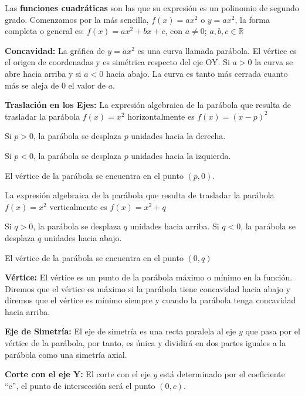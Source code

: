 \documentclass[12pt,a4paper]{article}
\begin{document}
\begin{tcolorbox}[colback=fondorosa,colframe=rojoclaro,title=\textbf{Mini-explicación: Elementos en la gráfica},breakable]

Las \textbf{funciones cuadráticas} son las que su expresión es un polinomio de segundo grado. Comenzamos por la más sencilla, $f(x) = ax^2$ o $y = ax^2$, la forma completa o general es: $f(x) = ax^2 + bx + c$, con $a \neq 0$; $a, b, c \in \mathbb{R}$

\textbf{Concavidad:} La gráfica de $y = ax^2$ es una curva llamada parábola. El vértice es el origen de coordenadas y es simétrica respecto del eje OY. Si $a > 0$ la curva se abre hacia arriba y si $a < 0$ hacia abajo. La curva es tanto más cerrada cuanto más se aleja de 0 el valor de $a$.

\textbf{Traslación en los Ejes:} La expresión algebraica de la parábola que resulta de trasladar la parábola $f(x) = x^2$ horizontalmente es $f(x) = (x - p)^2$

Si $p > 0$, la parábola se desplaza $p$ unidades hacia la derecha.

Si $p < 0$, la parábola se desplaza $p$ unidades hacia la izquierda.

El vértice de la parábola se encuentra en el punto $(p, 0)$.

La expresión algebraica de la parábola que resulta de trasladar la parábola $f(x) = x^2$ verticalmente es $f(x) = x^2 + q$

Si $q > 0$, la parábola se desplaza $q$ unidades hacia arriba. Si $q < 0$, la parábola se desplaza $q$ unidades hacia abajo.

El vértice de la parábola se encuentra en el punto $(0, q)$

\vspace{0.5cm}

\textbf{Vértice:} El vértice es un punto de la parábola máximo o mínimo en la función. Diremos que el vértice es máximo si la parábola tiene concavidad hacia abajo y diremos que el vértice es mínimo siempre y cuando la parábola tenga concavidad hacia arriba.

\textbf{Eje de Simetría:} El eje de simetría es una recta paralela al eje $y$ que pasa por el vértice de la parábola, por tanto, es única y dividirá en dos partes iguales a la parábola como una simetría axial.

\textbf{Corte con el eje Y:} El corte con el eje $y$ está determinado por el coeficiente ``c'', el punto de intersección será el punto $(0, c)$.


\end{tcolorbox}
\end{document}
